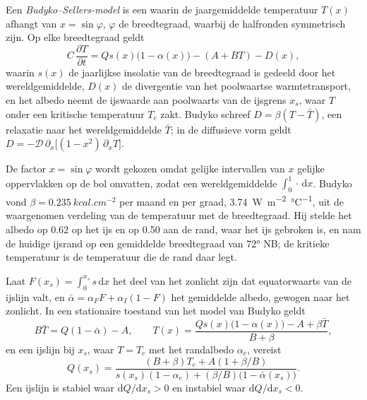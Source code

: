 \begin{definition}\label{def:b3:climate-models:budyko-sellers}
Een \emph{Budyko--Sellers-model} is een
 waarin de jaargemiddelde temperatuur $T(x)$ afhangt van
$x = \sin\varphi$, $\varphi$ de breedtegraad, waarbij de halfronden symmetrisch zijn.
Op elke breedtegraad geldt
\[
C\,\frac{\partial T}{\partial t} = Qs(x)\big(1 - \alpha(x)\big) - (A + BT) - D(x) ,
\]
waarin $s(x)$ de jaarlijkse insolatie van de breedtegraad is gedeeld door het
wereldgemiddelde, $D(x)$ de divergentie van het poolwaartse warmtetransport, en het albedo
neemt de ijswaarde aan poolwaarts van de ijsgrens $x_s$, waar $T$ onder een
kritische temperatuur $T_c$ zakt. Budyko schreef $D = \beta(T - \bar T)$, een
relaxatie naar het wereldgemiddelde $\bar T$; in de diffusieve vorm geldt $D =
-\mathcal D\,\partial_x\big[(1 - x^2)\,\partial_xT\big]$.
\end{definition}

De factor $x = \sin\varphi$ wordt gekozen omdat gelijke intervallen van $x$
gelijke oppervlakken op de bol omvatten, zodat een wereldgemiddelde $\int_0^1\cdot\,\mathrm
dx$. Budyko vond $\beta = \qty{0.235}{kcal.cm^{-2}}$ per maand en per
graad, \qty{3.74}{W.m^{-2}.\celsius^{-1}}, uit de waargenomen verdeling
van de temperatuur met de breedtegraad. Hij stelde het albedo op 0.62 op het ijs en op 0.50 aan de rand,
waar het ijs gebroken is, en nam de huidige ijsrand op een gemiddelde breedtegraad
van \ang{72} NB; de kritieke temperatuur is de temperatuur die de rand
daar legt.

\begin{proposition}\label{prop:b3:climate-models:iceline}
Laat $F(x_s) = \int_0^{x_s}s\,\mathrm dx$ het deel van het zonlicht zijn
dat equatorwaarts van de ijslijn valt, en $\bar\alpha = \alpha_FF + \alpha_I(1 -
F)$ het gemiddelde albedo, gewogen naar het zonlicht. In een stationaire toestand
van het model van Budyko geldt
\[
B\bar T = Q(1 - \bar\alpha) - A, \qquad
T(x) = \frac{Qs(x)\big(1 - \alpha(x)\big) - A + \beta\bar T}{B + \beta} ,
\]
en een ijslijn bij $x_s$, waar $T = T_c$ met het randalbedo $\alpha_e$,
vereist
\[
Q(x_s) = \frac{(B + \beta)T_c + A(1 + \beta/B)}{s(x_s)(1 - \alpha_e) +
(\beta/B)\big(1 - \bar\alpha(x_s)\big)} .
\]
Een ijslijn is stabiel waar $\mathrm dQ/\mathrm dx_s > 0$ en
instabiel waar $\mathrm dQ/\mathrm dx_s < 0$.
\end{proposition}

